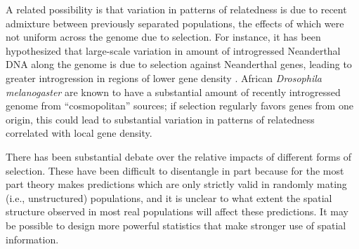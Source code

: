 \documentclass[11pt, oneside]{article}   	%
\newcommand\citep{\cite}
\begin{document}
A related possibility is that variation in patterns of relatedness is due to recent admixture between previously separated populations,
the effects of which were not uniform across the genome due to selection.
For instance, it has been hypothesized that large-scale variation in amount of introgressed Neanderthal DNA along the genome
is due to selection against Neanderthal genes, leading to greater introgression in regions of lower gene density
\citep{harris2016genetic,juric2016strength}.
African \textit{Drosophila melanogaster} are known to have a substantial amount of recently introgressed genome from ``cosmopolitan'' sources;
if selection regularly favors genes from one origin,
this could lead to substantial variation in patterns of relatedness correlated with local gene density.

There has been substantial debate over the relative impacts of different forms of selection.
These have been difficult to disentangle in part because for the most part
theory makes predictions which are only strictly valid in randomly mating (i.e., unstructured) populations,
and it is unclear to what extent the spatial structure observed in most real populations will affect these predictions.
It may be possible to design more powerful statistics that make stronger use of spatial information.
\end{document}
